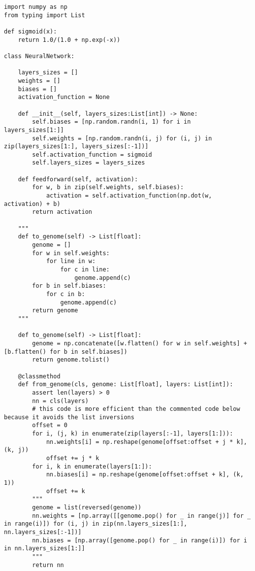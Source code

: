 \documentclass[11pt,a4paper]{article}
\begin{document}
\begin{verbatim}
import numpy as np
from typing import List

def sigmoid(x):
    return 1.0/(1.0 + np.exp(-x))

class NeuralNetwork:

    layers_sizes = []
    weights = []
    biases = []
    activation_function = None

    def __init__(self, layers_sizes:List[int]) -> None:
        self.biases = [np.random.randn(i, 1) for i in layers_sizes[1:]]
        self.weights = [np.random.randn(i, j) for (i, j) in zip(layers_sizes[1:], layers_sizes[:-1])]
        self.activation_function = sigmoid
        self.layers_sizes = layers_sizes

    def feedforward(self, activation):
        for w, b in zip(self.weights, self.biases):
            activation = self.activation_function(np.dot(w, activation) + b)
        return activation

    """
    def to_genome(self) -> List[float]:
        genome = []
        for w in self.weights:
            for line in w:
                for c in line:
                    genome.append(c)
        for b in self.biases:
            for c in b:
                genome.append(c)
        return genome
    """

    def to_genome(self) -> List[float]:
        genome = np.concatenate([w.flatten() for w in self.weights] + [b.flatten() for b in self.biases])
        return genome.tolist()

    @classmethod
    def from_genome(cls, genome: List[float], layers: List[int]):
        assert len(layers) > 0
        nn = cls(layers)
        # this code is more efficient than the commented code below because it avoids the list inversions
        offset = 0
        for i, (j, k) in enumerate(zip(layers[:-1], layers[1:])):
            nn.weights[i] = np.reshape(genome[offset:offset + j * k], (k, j))
            offset += j * k
        for i, k in enumerate(layers[1:]):
            nn.biases[i] = np.reshape(genome[offset:offset + k], (k, 1))
            offset += k
        """
        genome = list(reversed(genome))
        nn.weights = [np.array([[genome.pop() for _ in range(j)] for _ in range(i)]) for (i, j) in zip(nn.layers_sizes[1:], nn.layers_sizes[:-1])]
        nn.biases = [np.array([genome.pop() for _ in range(i)]) for i in nn.layers_sizes[1:]]
        """
        return nn

\end{verbatim}
\end{document}
